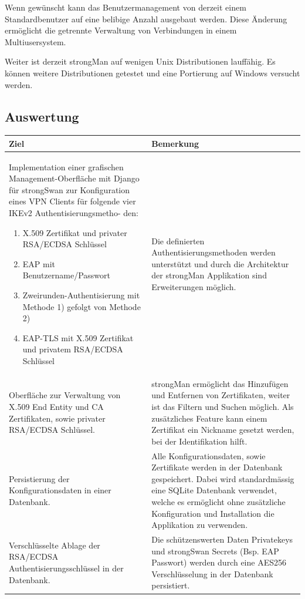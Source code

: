 Wenn gewünscht kann das Benutzermanagement von derzeit einem Standardbenutzer auf eine belibige Anzahl ausgebaut werden. Diese Änderung ermöglicht die getrennte Verwaltung von Verbindungen in einem Multiusersystem.

Weiter ist derzeit strongMan auf wenigen Unix Distributionen lauffähig. Es können weitere Distributionen getestet und eine Portierung auf Windows versucht werden.


\subsection{Auswertung}
\begin{table}[H]
	\centering
    \begin{tabular}{|p{}|p{}|}
    \hline    
    \rowcolor{lightblue}
	Ziel &  Bemerkung\\ \hline   
	Implementation einer grafischen Management-Oberfläche mit Django für strongSwan
    zur Konfiguration eines VPN Clients für folgende vier IKEv2 Authentisierungsmetho-
    den:
    \begin{enumerate}
        \item X.509 Zertifikat und privater RSA/ECDSA Schlüssel
        \item EAP mit Benutzername/Passwort
        \item Zweirunden-Authentisierung mit Methode 1) gefolgt von Methode 2)
        \item EAP-TLS mit X.509 Zertifikat und privatem RSA/ECDSA Schlüssel
    \end{enumerate}
	& Die definierten Authentisierungsmethoden werden unterstützt und durch die Architektur der strongMan Applikation sind Erweiterungen möglich.  \\ \hline
	Oberfläche zur Verwaltung von X.509 End Entity und CA Zertifikaten, sowie privater
    RSA/ECDSA Schlüssel. & strongMan ermöglicht das Hinzufügen und Entfernen von Zertifikaten,  weiter ist das Filtern und Suchen möglich. Als zusätzliches Feature kann einem Zertifikat ein Nickname gesetzt werden, bei der Identifikation hilft.
    \\ \hline
    Persistierung der Konfigurationsdaten in einer Datenbank. & Alle Konfigurationsdaten, sowie Zertifikate werden in der Datenbank gespeichert. Dabei wird standardmässig eine SQLite Datenbank verwendet, welche es ermöglicht ohne zusätzliche Konfiguration und Installation die Applikation zu verwenden. \\ \hline
    Verschlüsselte Ablage der RSA/ECDSA Authentisierungsschlüssel in der Datenbank. & Die schützenswerten Daten Privatekeys und strongSwan Secrets (Bsp. EAP Passwort) werden durch eine AES256 Verschlüsselung in der Datenbank persistiert. \\ \hline

\end{tabular}
\end{table}
